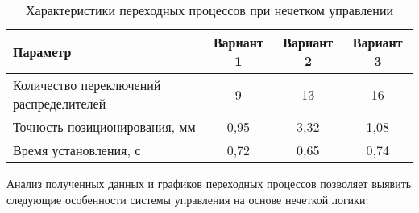 \begin{table}[h]
	\centering
	\caption{Характеристики переходных процессов при нечетком управлении}
	\label{tab:transition_processes_fuzzy}
	\small
	\begin{tabular}{lccc}
		\midrule
		\textbf{Параметр}                       & \textbf{Вариант 1} & \textbf{Вариант 2} & \textbf{Вариант 3} \\
		\midrule
		Количество переключений распределителей & 9                  & 13                 & 16                 \\
		Точность позиционирования, мм           & 0,95               & 3,32               & 1,08               \\
		Время установления, с                   & 0,72               & 0,65               & 0,74               \\
		\midrule
	\end{tabular}
\end{table}

Анализ полученных данных и графиков переходных процессов позволяет выявить следующие особенности системы управления на основе нечеткой логики:

